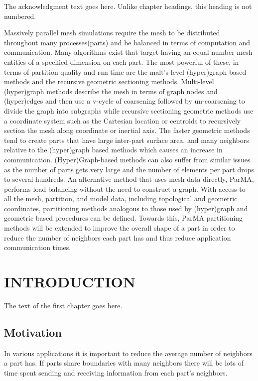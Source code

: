 \documentclass{thesis}
\author{Gerrett Diamond, Cameron Smith}
\begin{document}
 
\titlepage             %
\tableofcontents       %
\listoftables          %
\listoffigures         %

The acknowledgment text goes here. Unlike chapter headings, 
this heading is not numbered.

Massively parallel mesh simulations require the mesh to be distributed
throughout many processes(parts) and be balanced in terms of computation and
communication. 
Many algorithms exist that target having an equal number mesh entities of a
specified dimension on each part. 
The most powerful of these, in terms of partition quality and run time are the
malt's-level (hyper)graph-based methods and the recursive geometric sectioning
methods. 
Multi-level (hyper)graph methods describe the mesh in terms of graph nodes and
(hyper)edges and then use a v-cycle of coarsening followed by un-coarsening to
divide the graph into subgraphs while recursive sectioning geometric methods use
a coordinate system such as the Cartesian location or centroids to recursively
section the mesh along coordinate or inertial axis. 
The faster geometric methods tend to create parts that have large inter-part
surface area, and many neighbors relative to the (hyper)graph based methods
which causes an increase in communication.
(Hyper)Graph-based methods can also suffer from similar issues as the number of
parts gets very large and the number of elements per part drops to several
hundreds. 
An alternative method that uses mesh data directly, ParMA, performs load 
balancing without the need to construct a graph. 
With access to all the mesh, partition, and model data, including topological 
and geometric coordinates, partitioning methods analogous to those used by 
(hyper)graph and geometric based procedures can be defined.
Towards this, ParMA partitioning methods will be extended to improve the 
overall shape of a part in order to reduce the number of neighbors each part 
has and thus reduce application communication times.

\chapter{INTRODUCTION}
The text of the first chapter goes here. 


\section{Motivation}
In various applications it is important to reduce the average number of 
neighbors a part has. If parts share boundaries with many neighbors there will 
be lots of time spent sending and receiving information from each part's 
neighbors.
\end{document}
